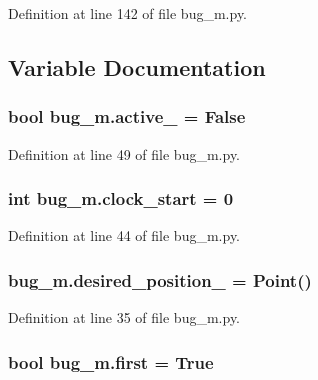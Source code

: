 Definition at line 142 of file bug\+\_\+m.\+py.



\subsection{Variable Documentation}
\subsubsection[{\texorpdfstring{active\+\_\+}{active_}}]{\setlength{\rightskip}{0pt plus 5cm}bool bug\+\_\+m.\+active\+\_\+ = False}\hypertarget{namespacebug__m_aac2be257b1acdebfb27dab0e311550d4}{}\label{namespacebug__m_aac2be257b1acdebfb27dab0e311550d4}


Definition at line 49 of file bug\+\_\+m.\+py.

\subsubsection[{\texorpdfstring{clock\+\_\+start}{clock_start}}]{\setlength{\rightskip}{0pt plus 5cm}int bug\+\_\+m.\+clock\+\_\+start = 0}\hypertarget{namespacebug__m_aae90b9eab9f94959ccd1b8e34d6cb837}{}\label{namespacebug__m_aae90b9eab9f94959ccd1b8e34d6cb837}


Definition at line 44 of file bug\+\_\+m.\+py.

\subsubsection[{\texorpdfstring{desired\+\_\+position\+\_\+}{desired_position_}}]{\setlength{\rightskip}{0pt plus 5cm}bug\+\_\+m.\+desired\+\_\+position\+\_\+ = Point()}\hypertarget{namespacebug__m_a8fb60e35f164091fe3355d3a0bce95af}{}\label{namespacebug__m_a8fb60e35f164091fe3355d3a0bce95af}


Definition at line 35 of file bug\+\_\+m.\+py.

\subsubsection[{\texorpdfstring{first}{first}}]{\setlength{\rightskip}{0pt plus 5cm}bool bug\+\_\+m.\+first = True}\hypertarget{namespacebug__m_ae17fcdd9f4bb70982175997ec3b37fdc}{}\label{namespacebug__m_ae17fcdd9f4bb70982175997ec3b37fdc}


